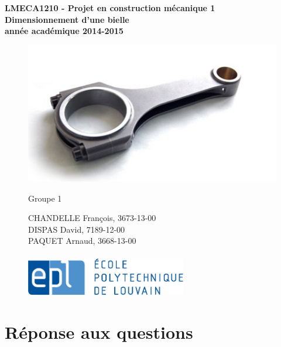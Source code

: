 \documentclass[a4paper,oneside,11pt]{report}
\begin{document}
\begin{titlepage}
\hfill

\begin{center}
\Huge
\textbf{LMECA1210 - Projet en construction mécanique 1\\}
\vspace{0.5cm}
\huge
\textbf{Dimensionnement d'une bielle\\}
\Large
\vspace{0.5cm}
\textbf{année académique 2014-2015\\}
\vspace{0.5cm}
\begin{figure}[b!]
	\center
	\includegraphics[width=12cm]{bielle.jpg}
\end{figure}

\end{center}
\begin{figure}[b!]
\begin{Large}
	Groupe 1\\
\end{Large}
	CHANDELLE François, 3673-13-00\\
	DISPAS David, 7189-12-00\\
	PAQUET Arnaud, 3668-13-00\\
	\\
	\newline
	\center
	\includegraphics[width=7cm]{epl-logo.jpg}
\end{figure}
\end{titlepage}


\chapter{Réponse aux questions}
\end{document}

